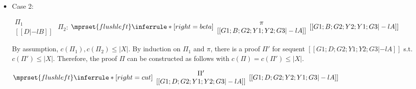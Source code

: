 \begin{itemize}
\item Case 2:
      \begin{center}
        \scriptsize
        \begin{math}
          \begin{array}{c}
            \Pi_1 \\
            {[[D |-l B]]}
          \end{array}
        \end{math}
        \qquad\qquad
        $\Pi_2$:
        \begin{math}
          $$\mprset{flushleft}
          \inferrule* [right={\tiny beta}] {
            {
              \begin{array}{c}
                \pi \\
                {[[G1; B; G2; Y1; Y2; G3 |-l A]]}
              \end{array}
            }
          }{[[G1; B; G2; Y2; Y1; G3 |-l A]]}
        \end{math}
      \end{center}
      By assumption, $c(\Pi_1),c(\Pi_2)\leq |X|$. By induction on $\Pi_1$
      and $\pi$, there is a proof $\Pi'$ for sequent
      $[[G1; D; G2; Y1; Y2; G3 |-l A]]$ s.t. $c(\Pi') \leq |X|$. Therefore,
      the proof $\Pi$ can be constructed as follows with
      $c(\Pi) = c(\Pi') \leq |X|$.
      \begin{center}
        \scriptsize
        \begin{math}
          $$\mprset{flushleft}
          \inferrule* [right={\tiny cut}] {
            {
              \begin{array}{cc}
                \Pi' \\
                {[[G1; D; G2; Y1; Y2; G3 |-l A]]}
              \end{array}
            }
          }{[[G1; D; G2; Y2; Y1; G3 |-l A]]}
        \end{math}
      \end{center}


\end{itemize}
